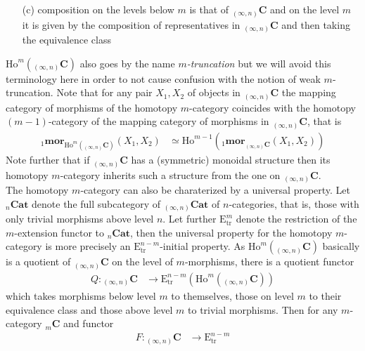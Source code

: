 \begin{itemize}
\begin{enumerate}
\item[(c)]
composition on the levels below $m$ is that of ${_{(\infty,n)}}\mathbf{C}$ and on the level $m$ it is given by the composition of representatives in ${_{(\infty,n)}}\mathbf{C}$ and then taking the equivalence class
\end{enumerate}
$\mathrm{Ho}^{m}({_{(\infty,n)}}\mathbf{C})$ also goes by the name \textit{$m$-truncation} but we will avoid this terminology here in order to not cause confusion with the notion of weak $m$-truncation. Note that for any pair $X_{1},X_{2}$ of objects in ${_{(\infty,n)}}\mathbf{C}$ the mapping category of morphisms of the homotopy $m$-category coincides with the homotopy $(m-1)$-category of the mapping category of morphisms in ${_{(\infty,n)}}\mathbf{C}$, that is
\begin{align*}
  {_{1}}\mathbf{mor}_{\mathrm{Ho}^{m}({_{(\infty,n)}}\mathbf{C})}
  (X_{1},X_{2})
  &\simeq
  \mathrm{Ho}^{m-1}
  \left(
    {_{1}}\mathbf{mor}_{{_{(\infty,n)}}\mathbf{C}}
    (X_{1},X_{2})
  \right)
\end{align*}
Note further that if ${_{(\infty,n)}}\mathbf{C}$ has a (symmetric) monoidal structure then its homotopy $m$-category inherits such a structure from the one on ${_{(\infty,n)}}\mathbf{C}$.
\\
The homotopy $m$-category can also be charaterized by a universal property. Let ${_{n}}\mathbf{Cat}$ denote the full subcategory of ${_{(\infty,n)}}\mathbf{Cat}$ of $n$-categories, that is, those with only trivial morphisms above level $n$. Let further $\mathrm{E}_{\mathrm{tr}}^{m}$ denote the restriction of the $m$-extension functor to ${_{n}}\mathbf{Cat}$, then the universal property for the homotopy $m$-category is more precisely an $\mathrm{E}_{\mathrm{tr}}^{n-m}$-initial property. As $\mathrm{Ho}^{m}({_{(\infty,n)}}\mathbf{C})$ basically is a quotient of ${_{(\infty,n)}}\mathbf{C}$ on the level of $m$-morphisms, there is a quotient functor
\begin{align*}
  Q
  \colon
  {_{(\infty,n)}}\mathbf{C}
  &\to
  \mathrm{E}_{\mathrm{tr}}^{n-m}
  \left(
    \mathrm{Ho}^{m}
    \left(
      {_{(\infty,n)}}\mathbf{C}
    \right)
  \right)
\end{align*}
which takes morphisms below level $m$ to themselves, those on level $m$ to their equivalence class and those above level $m$ to trivial morphisms. Then for any $m$-category ${_{m}}\mathbf{C}$ and functor
\begin{align*}
  F
  \colon
  {_{(\infty,n)}}\mathbf{C}
  &\to
  \mathrm{E}_{\mathrm{tr}}^{n-m}

\end{align*}
\end{itemize}
